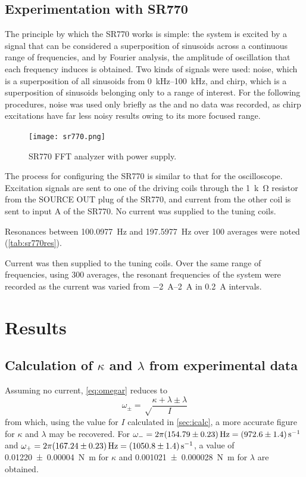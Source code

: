 \documentclass{article}
\begin{document}
\subsection{Experimentation with SR770}\label{sec:fftproc}
The principle by which the SR770 works is simple: the system is excited by a signal that can be considered a superposition of sinusoids across a continuous range of frequencies, and by Fourier analysis, the amplitude of oscillation that each frequency induces is obtained. Two kinds of signals were used: noise, which is a superposition of all sinusoids from \qtyrange{0}{100}{kHz}, and chirp, which is a superposition of sinusoids belonging only to a range of interest. For the following procedures, noise was used only briefly as the and no data was recorded, as chirp excitations have far less noisy results owing to its more focused range.

\begin{figure}
  \centering
  \texttt{[image: sr770.png]}
  \caption{SR770 FFT analyzer with power supply.}
\end{figure}

The process for configuring the SR770 is similar to that for the oscilloscope. Excitation signals are sent to one of the driving coils through the \qty{1}{k\ohm} resistor from the SOURCE OUT plug of the SR770, and current from the other coil is sent to input A of the SR770. No current was supplied to the tuning coils.

Resonances between \qty{100.0977}{Hz} and \qty{197.5977}{Hz} over 100 averages were noted (\autoref{tab:sr770res}).

Current was then supplied to the tuning coils. Over the same range of frequencies, using 300 averages, the resonant frequencies of the system were recorded as the current was varied from \qtyrange{-2}{2}{\ampere} in \qty{0.2}{\ampere} intervals.

\section{Results}

\subsection{Calculation of $\kappa$ and $\lambda$ from experimental data}
Assuming no current, \autoref{eq:omegar} reduces to
\begin{equation*}
	\omega_\pm = \sqrt\frac{\kappa+\lambda \pm \lambda}{I}
\end{equation*}
from which, using the value for $I$ calculated in \autoref{sec:icalc}, a more accurate figure for $\kappa$ and $\lambda$ may be recovered. For $\omega_- = 2\pi\qty{154.79 \pm 0.23}{Hz} = \qty{972.6 \pm 1.4}{s^{-1}}$ and $\omega_+ = 2\pi\qty{167.24 \pm 0.23}{Hz} = \qty{1050.8 \pm 1.4}{s^{-1}}$, a value of \qty{0.01220 \pm 0.00004}{N.m} for $\kappa$ and \qty{0.001021 \pm 0.000028}{N.m} for $\lambda$ are obtained.
\end{document}
